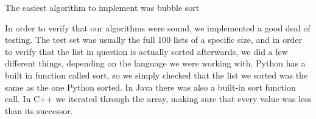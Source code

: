 \documentclass[12pt]{amsart}
\begin{document}
The easiest algorithm to implement was bubble sort

In order to verify that our algorithms were sound, we implemented a good deal of
testing. The test set was usually the full 100 lists of a specific size, and in
order to verify that the list in question is actually sorted afterwards, we did
a few different things, depending on the language we were working with. Python
has a built in function called sort, so we simply checked that the list we
sorted was the same as the one Python sorted. In Java there was also a built-in
sort function call. In C++ we iterated through the array, making sure that every
value was less than its successor.
\end{document}
